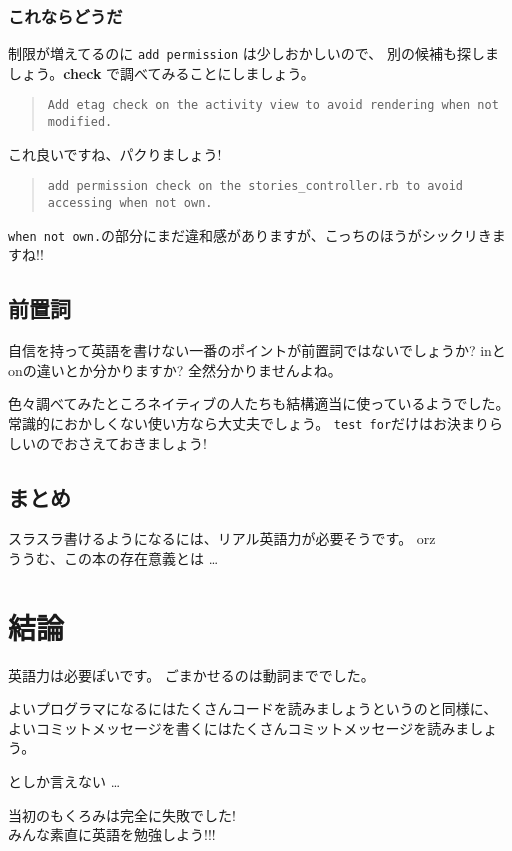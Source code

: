 \documentclass{jarticle}
\begin{document}
  \subsubsection{これならどうだ}
  制限が増えてるのに {\tt add permission} は少しおかしいので、
  別の候補も探しましょう。{\bf check} で調べてみることにしましょう。

  \begin{quote}
   {\tt Add etag check on the activity view to avoid rendering when not
   modified.}
  \end{quote}
  これ良いですね、パクりましょう!
   \begin{quote}
    {\tt add permission check on the stories\_controller.rb to avoid accessing when not own.}
   \end{quote}
   {\tt when not own.}の部分にまだ違和感がありますが、こっちのほうがシックリきますね!!

  \subsection{前置詞}
  自信を持って英語を書けない一番のポイントが前置詞ではないでしょうか?
  inとonの違いとか分かりますか? 全然分かりませんよね。

  色々調べてみたところネイティブの人たちも結構適当に使っているようでした。
  常識的におかしくない使い方なら大丈夫でしょう。
  {\tt test for}だけはお決まりらしいのでおさえておきましょう!

  \subsection{まとめ}
  スラスラ書けるようになるには、リアル英語力が必要そうです。 orz\\
  ううむ、この本の存在意義とは \dots

 \section{結論}
  英語力は必要ぽいです。
  ごまかせるのは動詞まででした。

  よいプログラマになるにはたくさんコードを読みましょうというのと同様に、
  よいコミットメッセージを書くにはたくさんコミットメッセージを読みましょ
  う。

  としか言えない \dots

  \begin{center}
  \Large
   当初のもくろみは完全に失敗でした!\\
   みんな素直に英語を勉強しよう!!!
  \end{center}
\end{document}
